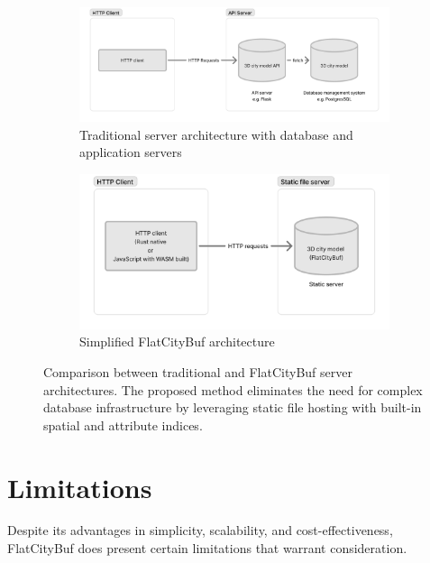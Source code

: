 \begin{figure}[htbp]
  \centering
  \begin{subfigure}[b]{0.48\textwidth}
    \centering
    \includegraphics[width=\textwidth]{figs/discussion/server_architecture.png}
    \caption{Traditional server architecture with database and application servers}
    \label{fig:traditional_architecture}
  \end{subfigure}
  \hfill
  \begin{subfigure}[b]{0.48\textwidth}
    \centering
    \includegraphics[width=\textwidth]{figs/discussion/server_architecture_fcb.png}
    \caption{Simplified FlatCityBuf architecture}
    \label{fig:fcb_architecture}
  \end{subfigure}
  \caption{Comparison between traditional and FlatCityBuf server architectures. The proposed method eliminates the need for complex database infrastructure by leveraging static file hosting with built-in spatial and attribute indices.}
  \label{fig:architecture_comparison}
\end{figure}

\section{Limitations}
\label{limitations}

Despite its advantages in simplicity, scalability, and cost-effectiveness, FlatCityBuf does present certain limitations that warrant consideration.

